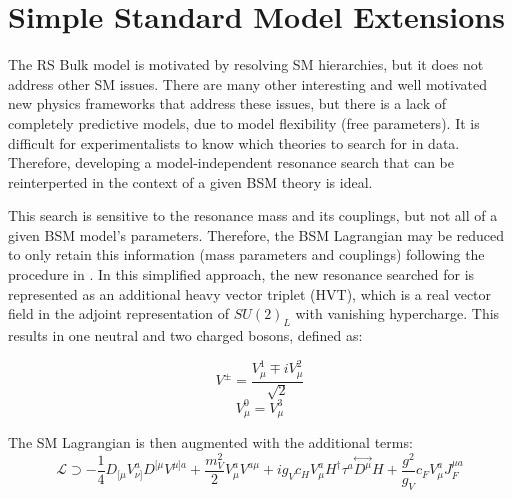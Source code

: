 \section{Simple Standard Model Extensions}
\label{HVT chapter}
The RS Bulk model is motivated by resolving SM hierarchies, but it does not address other SM issues. There are many other interesting and well motivated new physics frameworks that address these issues, but there is a lack of completely predictive models, due to model flexibility (free parameters). It is difficult for experimentalists to know which theories to search for in data. Therefore, developing a model-independent resonance search that can be reinterperted in the context of a given BSM theory is ideal.

This search is sensitive to the resonance mass and its couplings, but not all of a given BSM model's parameters. Therefore, the BSM Lagrangian may be reduced to only retain this information (mass parameters and couplings) following the procedure in \cite{hvt}.
In this simplified approach, the new resonance searched for is represented as an additional heavy vector triplet (HVT), which is a real vector field in the adjoint representation of $SU(2)_{L}$ with vanishing hypercharge. This results in one neutral and two charged bosons, defined as:

\begin{equation}
V^{\pm}=\frac{V^{1}_{\mu}\mp iV^{2}_{\mu}}{\sqrt{2}}
\end{equation}
\begin{equation}
V^{0}_{\mu}=V^{3}_{\mu}
\end{equation}

The SM Lagrangian is then augmented with the additional terms:
\begin{equation}
\label{hvt_lagrangian}
\mathcal{L}\supset -\frac{1}{4}D_{[\mu}V^{a}_{\nu]}D^{[\mu}V^{\mu]a} + \frac{m_{V}^{2}}{2}V^{a}_{\mu}V^{a\mu} + ig_{V}c_{H}V^{a}_{\mu}H^{\dag}\tau^{a}\overset\leftrightarrow{D^{\mu}}H+\frac{g^{2}}{g_{V}}c_{F}V^{a}_{\mu}J_{F}^{\mu a}
\end{equation}


